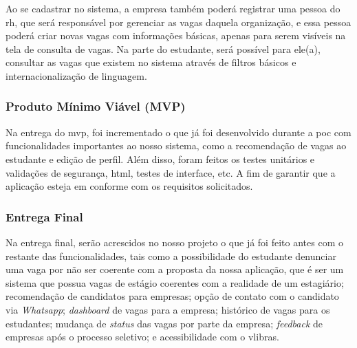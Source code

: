Ao se cadastrar no sistema, a empresa também poderá registrar uma pessoa do \ac{rh}, que será responsável por gerenciar as vagas daquela organização, e essa pessoa poderá criar novas vagas com informações básicas, apenas para serem visíveis na tela de consulta de vagas. Na parte do estudante, será possível para ele(a), consultar as vagas que existem no sistema através de filtros básicos e internacionalização de linguagem.

\subsubsection{Produto Mínimo Viável (MVP)}

Na entrega do \ac{mvp}, foi incrementado o que já foi desenvolvido durante a \ac{poc} com funcionalidades importantes ao nosso sistema, como a recomendação de vagas ao estudante e edição de perfil. Além disso, foram feitos os testes unitários e validações de segurança, \ac{html}, testes de interface, etc. A fim de garantir que a aplicação esteja em conforme com os requisitos solicitados.

\subsubsection{Entrega Final}

Na entrega final, serão acrescidos no nosso projeto o que já foi feito antes com o restante das funcionalidades, tais como a possibilidade do estudante denunciar uma vaga por não ser coerente com a proposta da nossa aplicação, que é ser um sistema que possua vagas de estágio coerentes com a realidade de um estagiário; recomendação de candidatos para empresas; opção de contato com o candidato via \textit{Whatsapp}; \textit{dashboard} de vagas para a empresa; histórico de vagas para os estudantes; mudança de \textit{status} das vagas por parte da empresa; \textit{feedback} de empresas após o processo seletivo; e acessibilidade com o \gls{vlibras}.